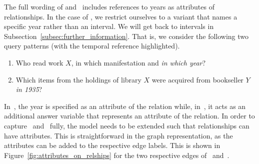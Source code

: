 The full wording of  and~ includes references to years
as attributes of relationships.
In the case of , we restrict ourselves to a variant that names
a specific year rather than an interval.
We will get back to intervals in Subsection~\ref{subsec:further_information}.
That is, we consider the following two query patterns (with the temporal reference highlighted).
%
\begin{enumerate}
  \item[\exaquery{1\phantom{$^\star$}}]
    Who read %
    work $X$, in which manifestation and \emph{in which year}?
  \item[\exaquery{5$^\star$}]
    Which items from the holdings of library $X$ were acquired from bookseller $Y$
    \emph{in 1935}?
\end{enumerate}
%
In~, the year is specified as an attribute of the  relation
while, in~, it acts as an additional answer variable that represents
an attribute of the  relation.
In order to capture~ and~ fully,
the model needs to be extended such that relationships can have attributes.
This is straightforward in the graph representation,
as the attributes can be added to
the respective edge labels. This is shown in Figure~\ref{fig:attributes_on_relships}
for the two respective edges of~ and~.

